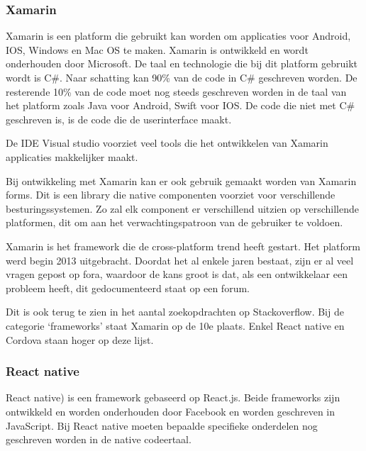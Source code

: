 		\autocite{Asp2017}
		
		
	\subsubsection{Xamarin}
		Xamarin is een platform die gebruikt kan worden om applicaties voor Android, IOS, Windows en Mac OS te maken.  Xamarin is ontwikkeld en wordt onderhouden door Microsoft. De taal en technologie die bij dit platform gebruikt wordt is C\#. Naar schatting kan 90\% van de code in C\# geschreven worden. De resterende 10\% van de code moet nog steeds geschreven worden in de taal van het platform zoals Java voor Android, Swift voor IOS. De code die niet met C\# geschreven is, is de code die de userinterface maakt.
		
		\autocite{Altexsoft2019} \autocite{Warcholinski2020}
		
		De IDE Visual studio voorziet veel tools die het ontwikkelen van Xamarin applicaties makkelijker maakt.
		\autocite{VisualStudio2020}
		
		
		Bij ontwikkeling met Xamarin kan er ook gebruik gemaakt worden van Xamarin forms. Dit is een library die native componenten voorziet voor verschillende besturingssystemen. Zo zal elk component er verschillend uitzien op verschillende platformen, dit om aan het verwachtingspatroon van de gebruiker te voldoen.
		\autocite{Microsoft2019}
	
		Xamarin is het framework die de cross-platform trend heeft gestart. Het platform werd begin 2013 uitgebracht. Doordat het al enkele jaren bestaat, zijn er al veel vragen gepost op fora, waardoor de kans groot is dat, als een ontwikkelaar een probleem heeft, dit gedocumenteerd staat op een forum.
		
		Dit is ook terug te zien in het aantal zoekopdrachten op Stackoverflow. Bij de categorie ‘frameworks’ staat Xamarin op de 10e plaats. Enkel React native en Cordova staan hoger op deze lijst.
		
		\autocite{StackOverflow2020}
		
	\subsubsection{React native}
		React native\autocite{Reactnative2020}) is een framework gebaseerd op React.js. Beide frameworks zijn ontwikkeld en worden onderhouden door Facebook en worden geschreven in JavaScript. Bij React native moeten bepaalde specifieke onderdelen nog geschreven worden in de native codeertaal. 
		

